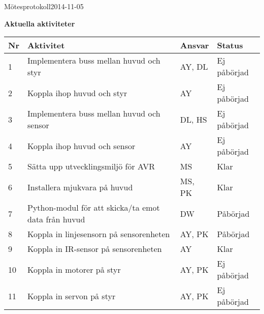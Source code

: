 \documentclass[titlepage, a4paper]{article}
\begin{document}
\begin{projektmote}{Mötesprotokoll}{2014-11-05}
\end{projektmote}


\newpage
\textbf{\Large Aktuella aktiviteter}
\begin{center}
\begin{tabularx}{\textwidth}{| p{4mm} | X | p{13.5mm} | X |}
	\hline
	\textbf{Nr} & \textbf{Aktivitet} & \textbf{Ansvar} & \textbf{Status} \\\hline
	{1} & {Implementera buss mellan huvud och styr} & {AY, DL} & {Ej påbörjad} \\\hline
	{2} & {Koppla ihop huvud och styr} & {AY} & {Ej påbörjad} \\\hline
	{3} & {Implementera buss mellan huvud och sensor} & {DL, HS} & {Ej påbörjad} \\\hline
	{4} & {Koppla ihop huvud och sensor} & {AY} & {Ej påbörjad} \\\hline
	{5} & {Sätta upp utvecklingsmiljö för AVR} & {MS} & {Klar} \\\hline
	{6} & {Installera mjukvara på huvud} & {MS, PK} & {Klar} \\\hline
	{7} & {Python-modul för att skicka/ta emot data från huvud} & {DW} & {Påbörjad} \\\hline
	{8} & {Koppla in linjesensorn på sensorenheten} & {AY, PK} & {Påbörjad} \\\hline
	{9} & {Koppla in IR-sensor på sensorenheten} & {AY} & {Klar} \\\hline
	{10} & {Koppla in motorer på styr} & {AY, PK} & {Ej påbörjad} \\\hline
	{11} & {Koppla in servon på styr} & {AY, PK} & {Ej påbörjad} \\\hline
\end{tabularx}
\end{center}
\end{document}
